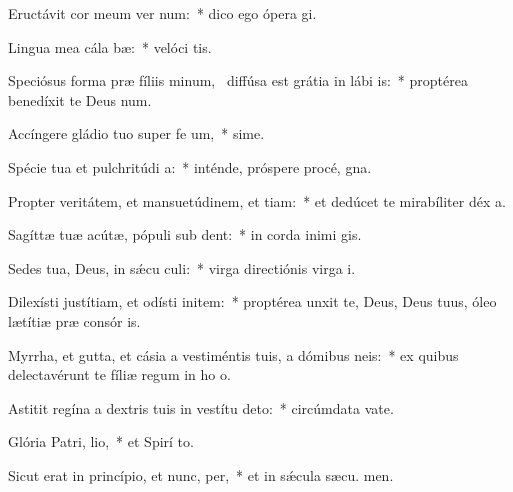 \item Eructávit cor meum ver num:~* dico ego ópera  gi.
\item Lingua mea cála bæ:~* velóci tis.
\item Speciósus forma præ fíliis minum,~\pscross{} diffúsa est grátia in lábi is:~* proptérea benedíxit te Deus  num.
\item Accíngere gládio tuo super fe um,~* sime.
\item Spécie tua et pulchritúdi a:~* inténde, próspere procé,  gna.
\item Propter veritátem, et mansuetúdinem, et tiam:~* et dedúcet te mirabíliter déx a.
\item Sagíttæ tuæ acútæ, pópuli sub  dent:~* in corda inimi gis.
\item Sedes tua, Deus, in sǽcu culi:~* virga directiónis virga  i.
\item Dilexísti justítiam, et odísti initem:~* proptérea unxit te, Deus, Deus tuus, óleo lætítiæ præ consór is.
\item Myrrha, et gutta, et cásia a vestiméntis tuis, a dómibus neis:~* ex quibus delectavérunt te fíliæ regum in ho o.
\item Astitit regína a dextris tuis in vestítu deto:~* circúmdata vate.
\item Glória Patri,  lio,~* et Spirí to.
\item Sicut erat in princípio, et nunc,  per,~* et in sǽcula sæcu. men.
